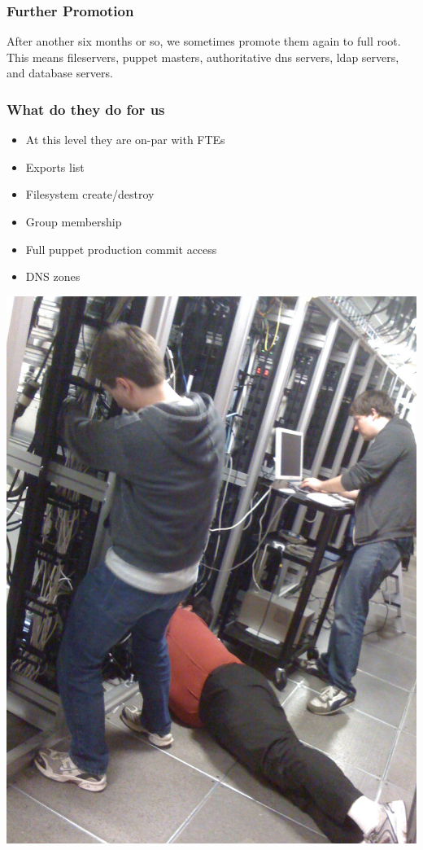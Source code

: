 \documentclass{beamer}
\begin{document}
\frame
{
    \frametitle{Further Promotion}
After another six months or so, we sometimes promote them again to full root.\\

This means fileservers, puppet masters, authoritative dns servers, ldap servers, and database servers.\\
}

\frame
{
    \frametitle{What do they do for us}
    \begin{itemize}
      \item At this level they are on-par with FTEs
      \item Exports list
      \item Filesystem create/destroy
      \item Group membership
      \item Full puppet production commit access
      \item DNS zones
    \end{itemize}
}

\frame
{
        \includegraphics[width=1\textwidth]{claws.jpg}
}
\end{document}
